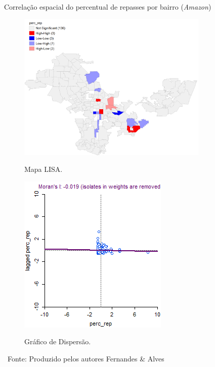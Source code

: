 \begin{figure}[H]
    \centering
     \caption{Correlação espacial do percentual de repasses por bairro (\textit{Amazon})}
     \begin{subfigure}{.45\textwidth}
         \centering
         \caption{Mapa LISA.}
         \includegraphics[height=0.75\textwidth]{images/6_amazon/geoda/BairrosLA_REP_lisa.png}
         \label{fig:AMAZON_LISA_REP}
     \end{subfigure}
     \begin{subfigure}{.45\textwidth}
       \centering
       \caption{Gráfico de Dispersão.}
       \includegraphics[height=0.75\textwidth]{images/6_amazon/geoda/BairrosLA_REP_scatter.png}
       \label{fig:AMAZON_SCT_REP}
     \end{subfigure}
     \caption*{\ Fonte: Produzido pelos autores Fernandes \& Alves}
 \end{figure} %

